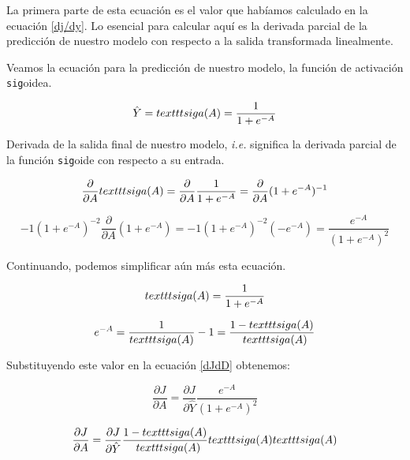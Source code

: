 \documentclass[a4paper,12pt]{article}
\begin{document}
La primera parte de esta ecuación es el valor que habíamos calculado en la ecuación \ref{dj/dy}. Lo esencial para calcular aquí es la derivada parcial de la predicción de nuestro modelo con respecto a la salida transformada linealmente.

Veamos la ecuación para la predicción de nuestro modelo, la función de activación \texttt{sig}oidea.

\begin{equation}
\hat{Y} = \\texttt{sig}a(A) = \frac{1}{1+e^{-A}}
\end{equation}

Derivada de la salida final de nuestro modelo, \textit{i.e.} significa la derivada parcial de la función \texttt{sig}oide con respecto a su entrada.

\begin{equation}
\frac{\partial}{\partial A} \\texttt{sig}a (A) = \frac{\partial}{\partial A} \frac{1}{1+e^{-A}} = \frac{\partial}{\partial A} (1+e^{-A})^{-1}
\end{equation}

\begin{equation}
 -1  (1+e^{-A})^{-2} \frac{\partial}{\partial A} (1+e^{-A}) = -1  (1+e^{-A})^{-2} (-e^{-A}) = \frac{e^{-A}}{(1+e^{-A})^2}
\end{equation}

Continuando, podemos simplificar aún más esta ecuación.

\begin{equation}
\\texttt{sig}a(A) = \frac{1}{1+e^{-A}}
\end{equation}

\begin{equation}
e^{-A} = \frac{1}{\\texttt{sig}a (A)} - 1 = \frac{1-\\texttt{sig}a (A)}{\\texttt{sig}a(A)}
\end{equation}

Substituyendo este valor en la ecuación \ref{dJdD} obtenemos:

\begin{equation}
\frac{\partial J}{\partial A} = \frac{\partial J}{\partial \hat{Y}} \frac{e^{-A}}{(1+e^{-A})^2}
\end{equation}

\begin{equation}
\frac{\partial J}{\partial A} = \frac{\partial J} {\partial \hat{Y} } \frac{1-\\texttt{sig}a(A)}{\\texttt{sig}a(A)} \\texttt{sig}a (A) \\texttt{sig}a (A)
\end{equation}
\end{document}
